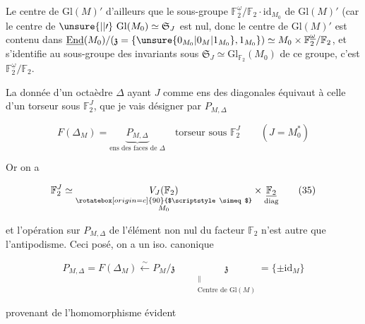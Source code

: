 Le centre de $\mathrm{Gl}(M)'$   d'ailleurs que le sous-groupe $\mathbb F_2^{\underline\omega}/\mathbb F_2\cdot\mathrm{id}_{M_0}$ de $\mathrm{Gl}(M)'$ (car le centre de $\unsure{\vert|\prime}\ \mathrm{Gl}(M_0)\simeq\mathfrak S_J$ est nul, donc le centre de $\mathrm{Gl}(M)'$ est contenu dans $\underline{\mathrm{End}}(M_0)/(\mathfrak z=\{\unsure{0_{M_0}|0_M|1_{M_0}},1_{M_0}\})\simeq M_0\times\mathbb F_2^{\underline\omega}/\mathbb F_2$, et s'identifie au sous-groupe des invariants sous $\mathfrak S_J\simeq\mathrm{Gl}_{\mathbb F_2}(M_0)$ de ce groupe, c'est $\mathbb F_2^{\underline\omega}/\mathbb F_2$.

La donnée d'un octaèdre $\Delta$ ayant $J$ comme ens des diagonales équivaut à celle d'un torseur
sous $\mathbb F_2^J$, que je vais désigner par $P_{M,\Delta}$

\[
 F(\Delta_M)=\underbrace{P_{M,\Delta}}_{\text{ens des faces de }\Delta}
 \quad\text{torseur sous }\mathbb F_2^J\qquad(J=M_0^*) \tag*{(34)}
\]

Or on a

\[
 \mathbb F_2^J\simeq\underset{\substack{\rotatebox[origin=c]{90}{$\scriptstyle\simeq$}\\ M_0}}{V_J(\mathbb F_2)}\times
 \underset{\text{diag}}{\underline{\mathbb F_2}}\tag*{(35)}
\]

et l'opération sur $P_{M,\Delta}$ de l'élément non nul  du facteur $\mathbb F_2$ n'est autre que l'antipodisme. Ceci posé, on a un iso. canonique

\[
 P_{M,\Delta}=F(\Delta_M)\xleftarrow{\sim}P_M/\mathfrak z
 \qquad\underset{\substack{\|\\\text{Centre de }\mathrm{Gl}(M)}}{\mathfrak z}
 =\{\pm\mathrm{id}_M\}\tag*{(36)}
\]

provenant de l’homomorphisme évident


